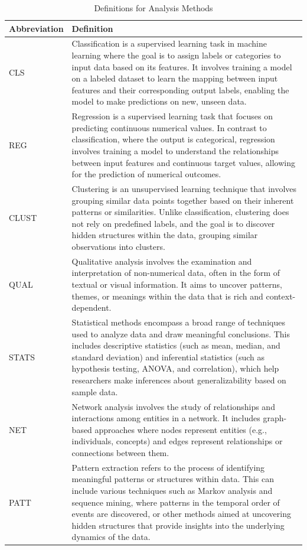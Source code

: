 \documentclass[manuscript,screen,review]{acmart}
\begin{document}
\begin{table}[ht]
\centering
\caption{Definitions for Analysis Methods}
\begin{tabular}{|l|p{}|}
\hline
\textbf{Abbreviation} & \textbf{Definition} \\
\hline
CLS & Classification is a supervised learning task in machine learning where the goal is to assign labels or categories to input data based on its features. It involves training a model on a labeled dataset to learn the mapping between input features and their corresponding output labels, enabling the model to make predictions on new, unseen data. \\
\hline
REG & Regression is a supervised learning task that focuses on predicting continuous numerical values. In contrast to classification, where the output is categorical, regression involves training a model to understand the relationships between input features and continuous target values, allowing for the prediction of numerical outcomes. \\
\hline
CLUST & Clustering is an unsupervised learning technique that involves grouping similar data points together based on their inherent patterns or similarities. Unlike classification, clustering does not rely on predefined labels, and the goal is to discover hidden structures within the data, grouping similar observations into clusters. \\
\hline
QUAL & Qualitative analysis involves the examination and interpretation of non-numerical data, often in the form of textual or visual information. It aims to uncover patterns, themes, or meanings within the data that is rich and context-dependent. \\
\hline
STATS & Statistical methods encompass a broad range of techniques used to analyze data and draw meaningful conclusions. This includes descriptive statistics (such as mean, median, and standard deviation) and inferential statistics (such as hypothesis testing, ANOVA, and correlation), which help researchers make inferences about generalizability based on sample data. \\
\hline
NET & Network analysis involves the study of relationships and interactions among entities in a network. It includes graph-based approaches where nodes represent entities (e.g., individuals, concepts) and edges represent relationships or connections between them.  \\
\hline
PATT & Pattern extraction refers to the process of identifying meaningful patterns or structures within data. This can include various techniques such as Markov analysis and sequence mining, where patterns in the temporal order of events are discovered, or other methods aimed at uncovering hidden structures that provide insights into the underlying dynamics of the data. \\
\hline
\end{tabular}
\label{tab:analysis_methods}
\end{table}
\end{document}
